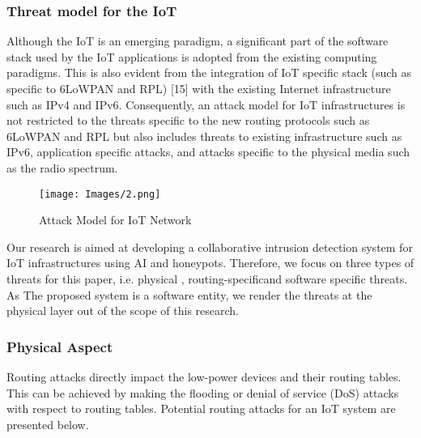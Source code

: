 \documentclass[letterpaper, 10 pt, conference]{ieeeconf}  %
\begin{document}
\subsubsection{Threat model for the IoT}
Although the IoT is an emerging paradigm, a significant part of the software stack used by the IoT applications is adopted from the existing computing paradigms. This is also evident from the integration of IoT specific stack (such as specific to 6LoWPAN and RPL) [15] with the existing Internet infrastructure such as IPv4 and IPv6. Consequently, an attack model for IoT infrastructures is not restricted to the threats specific to the new routing protocols such as 6LoWPAN and RPL but also includes threats to existing infrastructure such as IPv6, application specific attacks, and attacks specific to the physical media such as the radio spectrum.
\begin{figure}[thpb]
      \centering
      {\parbox{2.8in}{\texttt{[image: Images/2.png]}}}
      \caption{Attack Model for IoT Network}
      \label{fig:2}
\end{figure}

Our research is aimed at developing a collaborative intrusion detection system for IoT infrastructures using AI and honeypots. Therefore, we focus on three  types of threats for this paper, i.e. physical , routing-specificand software specific threats. As The proposed system is a software entity, we render the threats at the physical layer out of the scope of this research. \\

\subsubsection{Physical Aspect}
Routing attacks directly impact the low-power devices and their routing tables. This can be achieved by making the flooding or denial of service (DoS) attacks with respect to routing tables. Potential routing attacks for an IoT system are presented below.\\
\end{document}
